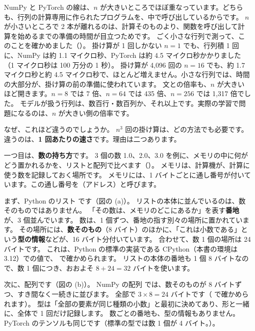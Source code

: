 NumPy と PyTorch の線は、$n$ が大きいところでほぼ重なっています。どちらも、行列の計算専用に作られたプログラムを、中で呼び出しているからです。
$n$ が小さいところで 2 本が離れるのは、計算そのものより、関数を呼び出して計算を始めるまでの準備の時間が目立つためです。
ごく小さな行列で測って、このことを確かめました（）。
掛け算が 1 回しかない $n=1$ でも、行列積 1 回に、NumPy は約 1.1 マイクロ秒、PyTorch は約 4.5 マイクロ秒かかりました（1 マイクロ秒は 100 万分の 1 秒）。
掛け算が 4,096 回の $n=16$ でも、約 1.7 マイクロ秒と約 4.5 マイクロ秒で、ほとんど増えません。小さな行列では、時間の大部分が、掛け算の前の準備に使われています。
 文との倍率も、$n$ が大きいほど開きます。$n=8$ では 7 倍、$n=64$ では 435 倍、$n=256$ では 1,317 倍でした。
モデルが扱う行列は、数百行・数百列か、それ以上です。実際の学習で問題になるのは、$n$ が大きい側の倍率です。

なぜ、これほど違うのでしょうか。
$n^{3}$ 回の掛け算は、どの方法でも必要です。違うのは、\textbf{1 回あたりの速さ}です。理由は二つあります。

一つ目は、\textbf{数の持ち方}です。
3 個の数 1.0、2.0、3.0 を例に、メモリの中に何がどう置かれるかを、リストと配列で比べます（）。
メモリは、計算機が、計算に使う数を記録しておく場所です。
メモリには、1 バイトごとに通し番号が付いています。この通し番号を（アドレス）と呼びます。

まず、Python のリスト \code{[1.0, 2.0, 3.0]} です（図の (a)）。
リストの本体に並んでいるのは、数そのものではありません。
「その数は、メモリのどこにあるか」を表す\textbf{番地}が、3 個並んでいます。
数は、1 個ずつ、番地の指す別々の場所に置かれています。
その場所には、\textbf{数そのもの}（8 バイト）のほかに、「これは小数である」という\textbf{型の情報}などが、16 バイト分付いています。
合わせて、数 1 個の場所は 24 バイトです。
これは、Python の標準の実装である CPython（本書の環境は 3.12）での値で、 で確かめられます。
リストの本体の番地も 1 個 8 バイトなので、数 1 個につき、おおよそ $8+24=32$ バイトを使います。

次に、配列です（図の (b)）。
NumPy の配列  では、数そのものが 8 バイトずつ、すき間なく一続きに並びます。
全部で $3\times 8=24$ バイトです（ で確かめられます）。
型は「全部の要素が同じ種類の小数」と最初に決めてあり、形と一緒に、全体で 1 回だけ記録します。
数ごとの番地も、型の情報もありません。
PyTorch のテンソルも同じです（標準の型では数 1 個が 4 バイト。）。

